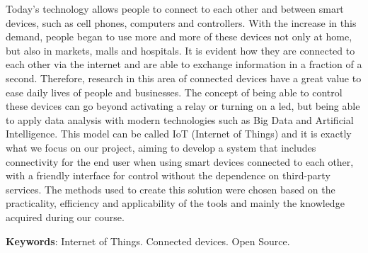 \documentclass[../../layout.tex]{subfiles}
\begin{document}
\begin{resumo}[Abstract]
\hspace*{3em}
Today's technology allows people to connect to each other and between smart devices, such as cell phones, computers and controllers. With the increase in this demand, people began to use more and more of these devices not only at home, but also in markets, malls and hospitals. It is evident how they are connected to each other via the internet and are able to exchange information in a fraction of a second. Therefore, research in this area of connected devices have a great value to ease daily lives of people and businesses. The concept of being able to control these devices can go beyond activating a relay or turning on a led, but being able to apply data analysis with modern technologies such as Big Data and Artificial Intelligence. This model can be called IoT (Internet of Things) and it is exactly what we focus on our project, aiming to develop a system that includes connectivity for the end user when using smart devices connected to each other, with a friendly interface for control without the dependence on third-party services. The methods used to create this solution were chosen based on the practicality, efficiency and applicability of the tools and mainly the knowledge acquired during our course.
\vspace{\onelineskip}

\noindent
\textbf{Keywords}: Internet of Things. Connected devices. Open Source.
\end{resumo}
\end{document}
